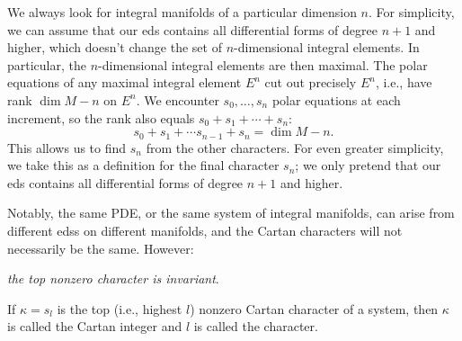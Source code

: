 We always look for integral manifolds of a particular dimension $n$. For simplicity, we can assume that our \gls{eds} contains all differential forms of degree $n+1$ and higher, which doesn't change the set of $n$-dimensional integral elements. In particular, the $n$-dimensional integral elements are then maximal. The polar equations of any maximal integral element $E^n$ cut out precisely $E^n$, i.e., have rank $\dim M-n$ on $E^n$. We encounter $s_0,\ldots,s_n$ polar equations at each increment, so the rank also equals $s_0+s_1+\cdots +s_n$:
\[s_0+s_1+\cdots s_{n-1}+s_n=\dim M-n.\label{eq final character}\]
This allows us to find $s_n$ from the other characters. For even greater simplicity, we take this as a definition for the final character $s_n$; we only pretend that our \gls{eds} contains all differential forms of degree $n+1$ and higher.

Notably, the same PDE, or the same system of integral manifolds, can arise from different \glspl{eds} on different manifolds, and the Cartan characters will not necessarily be the same. However: 
\begin{nscenter}
    \emph{the top nonzero character is invariant}.
\end{nscenter}

\begin{defn}
    If $\kappa=s_l$ is the top (i.e., highest $l$) nonzero Cartan character of a system, then $\kappa$ is called the Cartan integer and $l$ is called the character.
\end{defn}


